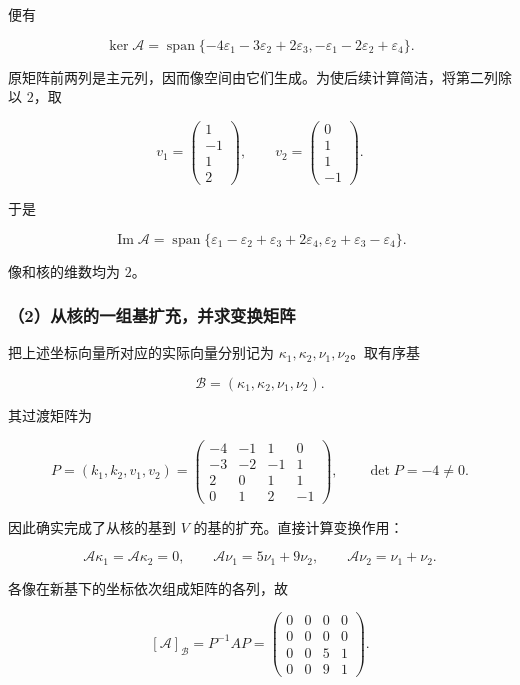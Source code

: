 \documentclass[11pt,fontset=fandol]{ctexart}
\begin{document}
便有

\[
\boxed{\ker\mathcal A=\operatorname{span}\{
-4\varepsilon_1-3\varepsilon_2+2\varepsilon_3,
-\varepsilon_1-2\varepsilon_2+\varepsilon_4\}}.
\]

原矩阵前两列是主元列，因而像空间由它们生成。为使后续计算简洁，将第二列除以
\(2\)，取

\[
v_1=\begin{pmatrix}1\\-1\\1\\2\end{pmatrix},\qquad
v_2=\begin{pmatrix}0\\1\\1\\-1\end{pmatrix}.
\]

于是

\[
\boxed{\operatorname{Im}\mathcal A=\operatorname{span}\{
\varepsilon_1-\varepsilon_2+\varepsilon_3+2\varepsilon_4,
\varepsilon_2+\varepsilon_3-\varepsilon_4\}}.
\]

像和核的维数均为 \(2\)。

\subsubsection{（2）从核的一组基扩充，并求变换矩阵}\label{ux4eceux6838ux7684ux4e00ux7ec4ux57faux6269ux5145ux5e76ux6c42ux53d8ux6362ux77e9ux9635}

把上述坐标向量所对应的实际向量分别记为
\(\kappa_1,\kappa_2,\nu_1,\nu_2\)。取有序基

\[
\mathcal B=(\kappa_1,\kappa_2,\nu_1,\nu_2).
\]

其过渡矩阵为

\[
P=(k_1,k_2,v_1,v_2)
=\begin{pmatrix}
-4&-1&1&0\\
-3&-2&-1&1\\
2&0&1&1\\
0&1&2&-1
\end{pmatrix},\qquad\det P=-4\ne0.
\]

因此确实完成了从核的基到 \(V\) 的基的扩充。直接计算变换作用：

\[
\mathcal A\kappa_1=\mathcal A\kappa_2=0,\qquad
\mathcal A\nu_1=5\nu_1+9\nu_2,\qquad
\mathcal A\nu_2=\nu_1+\nu_2.
\]

各像在新基下的坐标依次组成矩阵的各列，故

\[
\boxed{[\mathcal A]_{\mathcal B}=P^{-1}AP
=\begin{pmatrix}
0&0&0&0\\
0&0&0&0\\
0&0&5&1\\
0&0&9&1
\end{pmatrix}}.
\]
\end{document}
